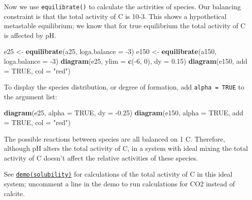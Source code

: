 \documentclass[]{tufte-book}
\newenvironment{Shaded}{}{}
\newcommand{\KeywordTok}[1]{\textcolor[rgb]{0.00,0.44,0.13}{\textbf{#1}}}
\newcommand{\DataTypeTok}[1]{\textcolor[rgb]{0.56,0.13,0.00}{#1}}
\newcommand{\DecValTok}[1]{\textcolor[rgb]{0.25,0.63,0.44}{#1}}
\newcommand{\FloatTok}[1]{\textcolor[rgb]{0.25,0.63,0.44}{#1}}
\newcommand{\StringTok}[1]{\textcolor[rgb]{0.25,0.44,0.63}{#1}}
\newcommand{\OtherTok}[1]{\textcolor[rgb]{0.00,0.44,0.13}{#1}}
\newcommand{\OperatorTok}[1]{\textcolor[rgb]{0.40,0.40,0.40}{#1}}
\newcommand{\NormalTok}[1]{#1}
\begin{document}
Now we use {\texttt{equilibrate()}} to calculate the activities of
species. Our balancing constraint is that the total activity of C is
10-3. This shows a hypothetical metastable equilibrium; we know that for
true equilibrium the total activity of C is affected by pH.

\begin{Shaded}
\begin{Highlighting}[]
\NormalTok{e25 <-}\StringTok{ }\KeywordTok{equilibrate}\NormalTok{(a25, }\DataTypeTok{loga.balance =} \OperatorTok{-}\DecValTok{3}\NormalTok{)}
\NormalTok{e150 <-}\StringTok{ }\KeywordTok{equilibrate}\NormalTok{(a150, }\DataTypeTok{loga.balance =} \OperatorTok{-}\DecValTok{3}\NormalTok{)}
\KeywordTok{diagram}\NormalTok{(e25, }\DataTypeTok{ylim =} \KeywordTok{c}\NormalTok{(}\OperatorTok{-}\DecValTok{6}\NormalTok{, }\DecValTok{0}\NormalTok{), }\DataTypeTok{dy =} \FloatTok{0.15}\NormalTok{)}
\KeywordTok{diagram}\NormalTok{(e150, }\DataTypeTok{add =} \OtherTok{TRUE}\NormalTok{, }\DataTypeTok{col =} \StringTok{"red"}\NormalTok{)}
\end{Highlighting}
\end{Shaded}

To display the species distribution, or degree of formation, add
\texttt{alpha\ =\ TRUE} to the argument list:

\begin{Shaded}
\begin{Highlighting}[]
\KeywordTok{diagram}\NormalTok{(e25, }\DataTypeTok{alpha =} \OtherTok{TRUE}\NormalTok{, }\DataTypeTok{dy =} \OperatorTok{-}\FloatTok{0.25}\NormalTok{)}
\KeywordTok{diagram}\NormalTok{(e150, }\DataTypeTok{alpha =} \OtherTok{TRUE}\NormalTok{, }\DataTypeTok{add =} \OtherTok{TRUE}\NormalTok{, }\DataTypeTok{col =} \StringTok{"red"}\NormalTok{)}
\end{Highlighting}
\end{Shaded}

The possible reactions between species are all balanced on 1 C.
Therefore, although pH alters the total activity of C, in a system with
ideal mixing the total activity of C doesn't affect the relative
activities of these species.

\begin{marginfigure}
See \href{../demo}{{\texttt{demo(solubility)}}} for calculations of the
total activity of C in this ideal system; uncomment a line in the demo
to run calculations for CO2 instead of calcite.
\end{marginfigure}
\end{document}
